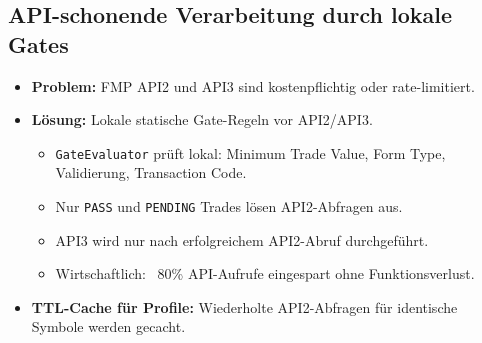 \subsection{API-schonende Verarbeitung durch lokale Gates}
\begin{itemize}
  \item \textbf{Problem:} FMP API2 und API3 sind kostenpflichtig oder rate-limitiert. %
  \item \textbf{Lösung:} Lokale statische Gate-Regeln vor API2/API3. %
    \begin{itemize}
      \item \texttt{GateEvaluator} prüft lokal: Minimum Trade Value, Form Type, Validierung, Transaction Code. %
      \item Nur \texttt{PASS} und \texttt{PENDING} Trades lösen API2-Abfragen aus. %
      \item API3 wird nur nach erfolgreichem API2-Abruf durchgeführt.
      \item Wirtschaftlich: ~80\% API-Aufrufe eingespart ohne Funktionsverlust. %
    \end{itemize}
  \item \textbf{TTL-Cache für Profile:} Wiederholte API2-Abfragen für identische Symbole werden gecacht. %
\end{itemize}
